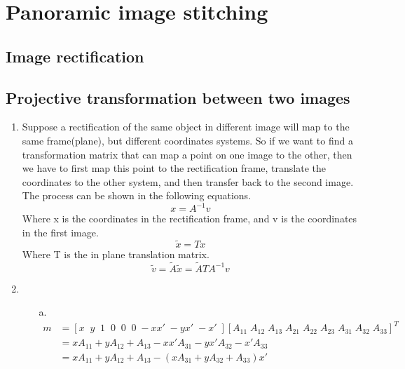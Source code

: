 \documentclass[10pt]{article}
\begin{document}
\section{Panoramic image stitching}
\subsection{Image rectification}
\subsection{Projective transformation between two images}
\begin{enumerate}
\item Suppose a rectification of the same object in different image will map to the same frame(plane), but different coordinates systems. So if we want to find a transformation matrix that can map a point on one image to the other, then we have to first map this point to the rectification frame, translate the coordinates to the other system, and then transfer back to the second image. The process can be shown in the following equations. \\
\begin{equation}
x = A^{-1}v
\end{equation}
Where x is the coordinates in the rectification frame, and v is the coordinates in the first image. \\
\begin{equation}
\tilde{x}=Tx
\end{equation}
Where T is the in plane translation matrix. \\
\begin{equation}
\tilde{v} = \tilde{A} \tilde{x} = \tilde{A} T A^{-1}v
\end{equation}
\item
\begin{enumerate}
\item[a.]
\begin{equation} \label{eqn:m0}
\begin{aligned}
m&=[x\;\; y\;\; 1\;\; 0\;\; 0\;\; 0\; -xx\prime\; -yx\prime\; -x\prime\;][A_{11}\; A_{12}\; A_{13}\; A_{21}\; A_{22}\; A_{23}\; A_{31}\; A_{32}\; A_{33}]^T  \\
&=xA_{11}+yA_{12}+A_{13}-xx\prime A_{31} -yx\prime A_{32}-x\prime A_{33} \\
&=xA_{11}+yA_{12}+A_{13}-(x A_{31} +y A_{32}+ A_{33})x\prime
\end{aligned}
\end{equation}

\end{enumerate}
\end{enumerate}
\end{document}
